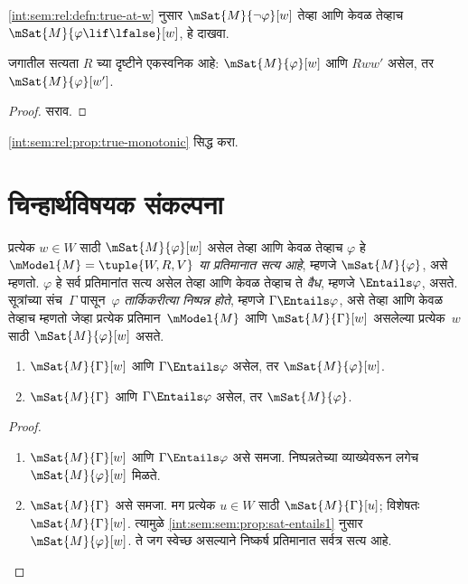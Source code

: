 \begin{prob}
  \ref{int:sem:rel:defn:true-at-w} नुसार
  $\mSat{M}{\lnot \varphi}[w]$ तेव्हा आणि केवळ तेव्हाच
  $\mSat{M}{\varphi \lif \lfalse}[w]$, हे दाखवा.
\end{prob}
\begin{prop}\label{int:sem:rel:prop:true-monotonic}
  जगातील सत्यता $R$ च्या दृष्टीने एकस्वनिक आहे:
  $\mSat{M}{\varphi}[w]$ आणि $Rww'$ असेल, तर
  $\mSat{M}{\varphi}[w']$.
\end{prop}
\begin{proof}
  सराव.
\end{proof}
\begin{prob}
  \ref{int:sem:rel:prop:true-monotonic} सिद्ध करा.
\end{prob}
\section{चिन्हार्थविषयक संकल्पना}\label{int:sem:sem:sec}
\begin{defn}
  प्रत्येक $w \in W$ साठी $\mSat{M}{\varphi}[w]$
  असेल तेव्हा आणि केवळ तेव्हाच $\varphi$ हे
  \emph{$\mModel{M} = \tuple{W,R,V}$ या प्रतिमानात
  सत्य आहे}, म्हणजे $\mSat{M}{\varphi}$, असे म्हणतो.
  $\varphi$ हे सर्व प्रतिमानांत सत्य असेल तेव्हा आणि
  केवळ तेव्हाच ते \emph{वैध}, म्हणजे
  $\Entails \varphi$, असते. सूत्रांच्या
  संच~$\Gamma$ पासून~$\varphi$ \emph{तार्किकरीत्या
  निष्पन्न होते}, म्हणजे $\Gamma \Entails \varphi$,
  असे तेव्हा आणि केवळ तेव्हाच म्हणतो जेव्हा
  प्रत्येक प्रतिमान~$\mModel{M}$ आणि
  $\mSat{M}{\Gamma}[w]$ असलेल्या प्रत्येक~$w$
  साठी $\mSat{M}{\varphi}[w]$ असते.
\end{defn}
\begin{prop}\label{int:sem:sem:prop:sat-entails}
  \begin{enumerate}
  \item\label{int:sem:sem:prop:sat-entails1}
    $\mSat{M}{\Gamma}[w]$ आणि
    $\Gamma \Entails \varphi$ असेल, तर
    $\mSat{M}{\varphi}[w]$.
  \item\label{int:sem:sem:prop:sat-entails2}
    $\mSat{M}{\Gamma}$ आणि $\Gamma
    \Entails \varphi$ असेल, तर $\mSat{M}{\varphi}$.
  \end{enumerate}
\end{prop}
\begin{proof}
  \begin{enumerate}
  \item $\mSat{M}{\Gamma}[w]$ आणि
    $\Gamma \Entails \varphi$ असे समजा.
    निष्पन्नतेच्या व्याख्येवरून लगेच
    $\mSat{M}{\varphi}[w]$ मिळते.
  \item $\mSat{M}{\Gamma}$ असे समजा.
    मग प्रत्येक $u \in W$ साठी
    $\mSat{M}{\Gamma}[u]$; विशेषतः
    $\mSat{M}{\Gamma}[w]$. त्यामुळे
    \ref{int:sem:sem:prop:sat-entails1} नुसार
    $\mSat{M}{\varphi}[w]$. ते जग स्वेच्छ असल्याने
    निष्कर्ष प्रतिमानात सर्वत्र सत्य आहे.
  \end{enumerate}
\end{proof}

